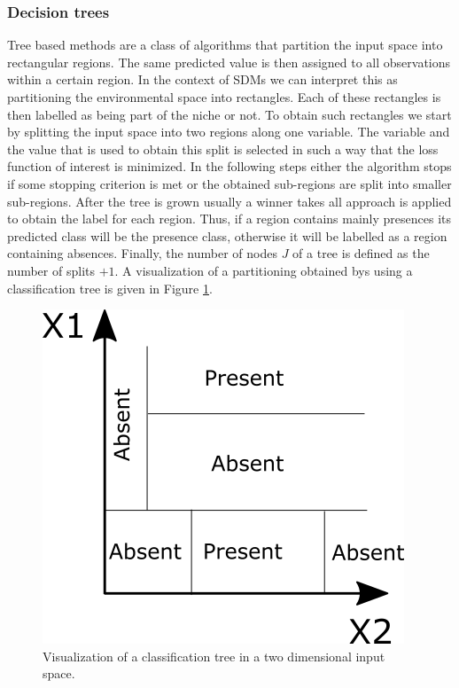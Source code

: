\subsubsection{Decision trees}
\label{sec:DecisionTrees}
Tree based methods are a class of algorithms that partition the input space into rectangular regions. The same predicted value is then assigned to all observations within a certain region. In the context of SDMs we can interpret this as partitioning the environmental space into rectangles. Each of these rectangles is then labelled as being part of the niche or not. To obtain such rectangles we start by splitting the input space into two regions along one variable. The variable and the value that is used to obtain this split is selected in such a way that the loss function of interest is minimized. In the following steps either the algorithm stops if some stopping criterion is met or the obtained sub-regions are split into smaller sub-regions. After the tree is grown usually a winner takes all approach is applied to obtain the label for each region. Thus, if a region contains mainly presences its predicted class will be the presence class, otherwise it will be labelled as a region containing absences. Finally, the number of nodes $J$ of a tree is defined as the number of splits $+1$. A visualization of a partitioning obtained bys using a classification tree is given in Figure \ref{fig:chClassificationTechniques:CART}. \\

\begin{figure}[!htb]
\centering
\includegraphics[scale=0.5]{VectorGraphics/CART.png}
\caption{\label{fig:chClassificationTechniques:CART}Visualization of a classification tree in a two dimensional input space.}
\end{figure}

